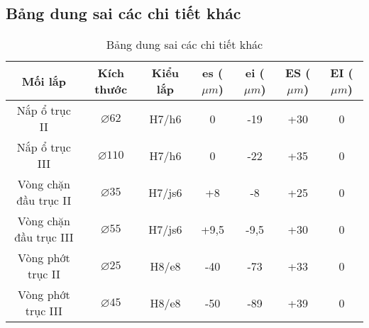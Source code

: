     \subsection{Bảng dung sai các chi tiết khác}
        \begin{table}[htbp]
            \centering
            \begin{tabular}{|c|c|c|c|c|c|c|}
                \hline
                Mối lắp & Kích thước & Kiểu lắp & es ($\mu m$) & ei ($\mu m$) & ES ($\mu m$) & EI ($\mu m$) \\
                \hline
                Nắp ổ trục II & $\varnothing62$ & H7/h6 & 0 & -19 & +30 & 0 \\
                \hline
                Nắp ổ trục III & $\varnothing110$ & H7/h6 & 0 & -22 & +35 & 0 \\
                \hline
                Vòng chặn đầu trục II & $\varnothing35$ & H7/js6 & +8 & -8 & +25 & 0 \\
                \hline
                Vòng chặn đầu trục III & $\varnothing55$ & H7/js6 & +9,5 & -9,5 & +30 & 0 \\
                \hline
                Vòng phớt trục II & $\varnothing25$ & H8/e8 & -40 & -73 & +33 & 0 \\
                \hline
                Vòng phớt trục III & $\varnothing45$ & H8/e8 & -50 & -89 & +39 & 0 \\
                \hline
            \end{tabular}
            \caption{Bảng dung sai các chi tiết khác}
        \end{table}

            
            